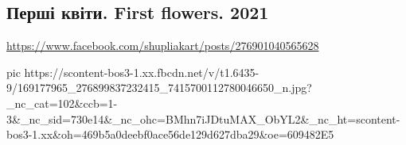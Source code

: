  
 
 
 
 

\subsection{Перші квіти. First flowers. 2021}
\url{https://www.facebook.com/shupliakart/posts/276901040565628}

\ifcmt
  pic https://scontent-bos3-1.xx.fbcdn.net/v/t1.6435-9/169177965_276899837232415_7415700112780046650_n.jpg?_nc_cat=102&ccb=1-3&_nc_sid=730e14&_nc_ohc=BMhn7iJDtuMAX_ObYL2&_nc_ht=scontent-bos3-1.xx&oh=469b5a0deebf0ace56de129d627dba29&oe=609482E5
\fi

